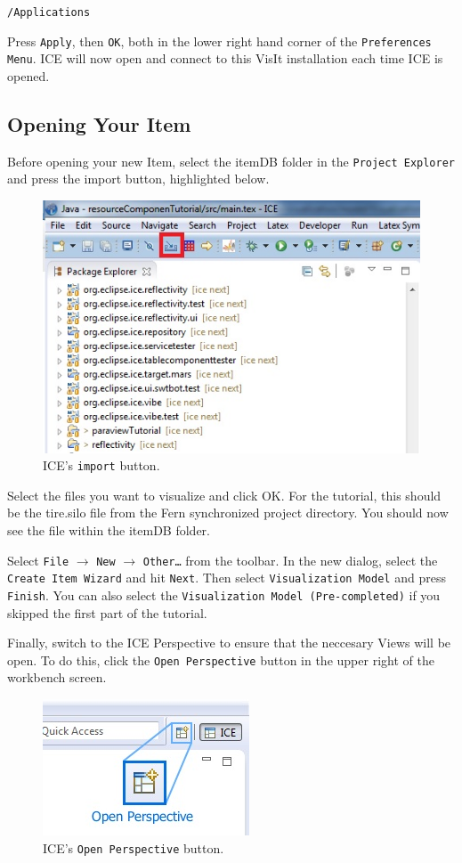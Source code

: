 \texttt{/Applications}

Press \texttt{Apply}, then \texttt{OK}, both in the lower right hand corner of
the \texttt{Preferences Menu}.
ICE will now open and connect to this VisIt installation each time ICE is opened.

\subsection{Opening Your Item}
Before opening your new Item, select the itemDB folder in the \texttt{Project
Explorer} and press the import button, highlighted below.

\begin{figure}[!h]
\includegraphics[width=12cm]{images/ImportButton}
\centering
\caption{ICE's \texttt{import} button.}
\label{fig:importbutton}
\end{figure}

Select the files you want to visualize and click OK. For the tutorial,
this should be the tire.silo file from the Fern synchronized project directory.
You should now see the file within the itemDB folder.

Select \texttt{File} $\rightarrow$ \texttt{New} $\rightarrow$
\texttt{Other\ldots} from the toolbar.
In the new dialog, select the \texttt{Create Item Wizard} and hit \texttt{Next}.
Then select \texttt{Visualization Model} and press \texttt{Finish}. You can also select the
\texttt{Visualization Model (Pre-completed)} if you skipped the first part of
the tutorial.

Finally, switch to the ICE Perspective to ensure that the neccesary Views will
be open. To do this, click the \texttt{Open Perspective} button in the upper right
of the workbench screen.

\begin{figure}[!h]
\includegraphics{images/ICE_OpenPerspective}
\centering
\caption{ICE's \texttt{Open Perspective} button.}
\label{fig:openpersepctive}
\end{figure}


